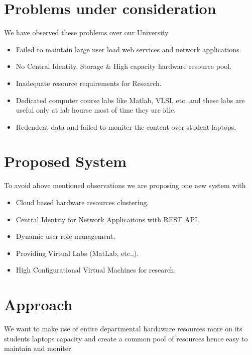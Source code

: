 \documentclass[12pt]{report}
\begin{document}
\section{Problems under consideration}

	We have observed these problems over our University
	
	\begin{itemize}
		\item Failed to maintain large user load web services  and network applications.
		\item No Central Identity, Storage \& High capacity hardware resource pool.
		\item Inadequate resource requirements for Research.
		\item Dedicated computer course labs like Matlab, VLSI, etc. and these labs are useful only at lab hourse most of time they are idle.
		\item Redendent data and failed to moniter the content over student laptops.
	\end{itemize}

\pagebreak
\section{Proposed System}

	To avoid above mentioned observations we are proposing one new system with 
	\begin{itemize}
		\item Cloud based hardware resources clustering.
		\item Central Identity for Network Applicaitons with REST API.
		\item Dynamic user role management.
		\item Providing Virtual Labs (MatLab, etc.,).
		\item High Configurational Virtual Machines for research.
	\end{itemize}
	
\section{Approach}

	We want to make use of entire departmental hardaware resources more on its students laptops capacity and create a common pool of resources hence easy to maintain and moniter.\\
	
\end{document}
